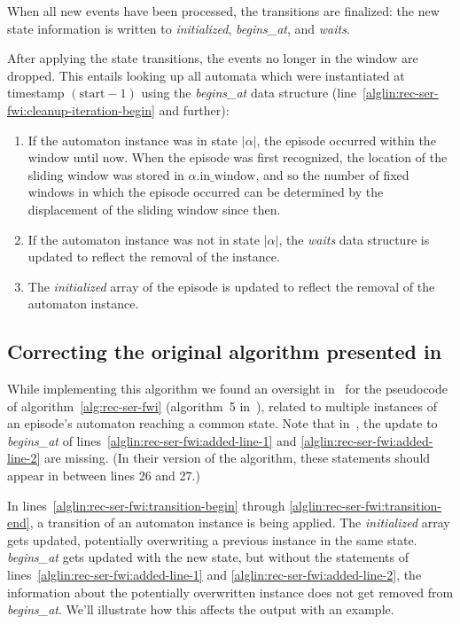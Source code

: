 When all new events have been processed, the transitions are finalized: the new state information is written to \emph{initialized}, \emph{begins\_at}, and \emph{waits}.

After applying the state transitions, the events no longer in the window are dropped. This entails looking up all automata which were instantiated at timestamp $ (\text{start} - 1) $ using the \emph{begins\_at} data structure (line~\ref{alglin:rec-ser-fwi:cleanup-iteration-begin} and further):

\begin{enumerate}
\item If the automaton instance was in state $ | \alpha | $, the episode occurred within the window until now. When the episode was first recognized, the location of the sliding window was stored in $ \alpha \text{.in\_window} $, and so the number of fixed windows in which the episode occurred can be determined by the displacement of the sliding window since then.
\item If the automaton instance was not in state $ | \alpha | $, the \emph{waits} data structure is updated to reflect the removal of the instance.
\item The \emph{initialized} array of the episode is updated to reflect the removal of the automaton instance.
\end{enumerate}

\subsection{Correcting the original algorithm presented in~\citep{mannila1997discovery}}

While implementing this algorithm we found an oversight in~\citep{mannila1997discovery} for the pseudocode of algorithm~\ref{alg:rec-ser-fwi} (algorithm~5 in~\citep{mannila1997discovery}), related to multiple instances of an episode's automaton reaching a common state. Note that in~\citep{mannila1997discovery}, the update to \emph{begins\_at} of lines~\ref{alglin:rec-ser-fwi:added-line-1} and \ref{alglin:rec-ser-fwi:added-line-2} are missing. (In their version of the algorithm, these statements should appear in between lines 26 and 27.)

In lines~\ref{alglin:rec-ser-fwi:transition-begin} through \ref{alglin:rec-ser-fwi:transition-end}, a transition of an automaton instance is being applied. The \emph{initialized} array gets updated, potentially overwriting a previous instance in the same state. \emph{begins\_at} gets updated with the new state, but without the statements of lines~\ref{alglin:rec-ser-fwi:added-line-1} and \ref{alglin:rec-ser-fwi:added-line-2}, the information about the potentially overwritten instance does not get removed from \emph{begins\_at}. We'll illustrate how this affects the output with an example.

